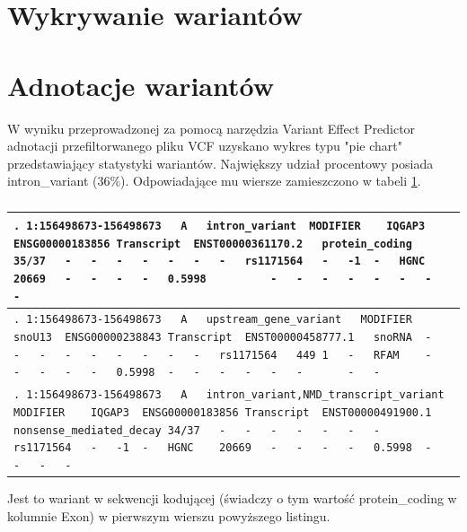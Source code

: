 \documentclass[a4paper]{article}
\begin{document}
\section{Wykrywanie wariantów}  


\section{Adnotacje wariantów}  
W wyniku przeprowadzonej za pomocą narzędzia Variant Effect Predictor adnotacji przefiltorwanego pliku VCF uzyskano wykres typu "pie chart" przedstawiający statystyki wariantów. Największy udział procentowy posiada intron\_variant (36\%). Odpowiadające mu wiersze zamieszczono w tabeli \ref{table:3lines}.

\begin{table}[H]
    \caption{
    \label{table:3lines}
    }
\begin{center}
\begin{tabular}{| p{150mm} |}

    \hline
    \verb|.	1:156498673-156498673	A	intron_variant	MODIFIER	IQGAP3	ENSG00000183856	Transcript	ENST00000361170.2	protein_coding	35/37	-	-	-	-	-	-	-	rs1171564	-	-1	-	HGNC	20669	-	-	-	-	0.5998	 		-	-	-	-	-	-	-	-|
    \\
    \hline
\verb|.	1:156498673-156498673	A	upstream_gene_variant	MODIFIER	snoU13	ENSG00000238843	Transcript	ENST00000458777.1	snoRNA	-	-	-	-	-	-	-	-	-	rs1171564	449	1	-	RFAM	-	-	-	-	-	0.5998	-	-	-	-	-	-		-	-|
    \\
    \hline
\verb|.	1:156498673-156498673	A	intron_variant,NMD_transcript_variant	MODIFIER	IQGAP3	ENSG00000183856	Transcript	ENST00000491900.1	nonsense_mediated_decay	34/37	-	-	-	-	-	-	-	rs1171564	-	-1	-	HGNC	20669	-	-	-	-	0.5998	-	-	-	-|
    \\
    \hline
\end{tabular}
\end{center}
\end{table}

Jest to wariant w sekwencji kodującej (świadczy o tym wartość protein\_coding w kolumnie Exon) w pierwszym wierszu powyższego listingu.
\end{document}
